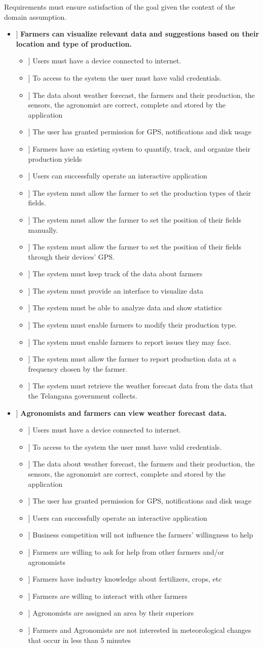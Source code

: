 \newcommand\goal[1]{\item[[ G#1]]}
\newcommand\dom[1]{\item[[ D#1]]}
\newcommand\req[1]{\item[[ R#1]]}

Requirements must ensure satisfaction of the goal given the context of the domain assumption.


\begin{itemize}
\goal{1} \textbf{Farmers can visualize relevant data and suggestions based on their location and type of production.}

\begin{itemize}
\dom{1}  Users must have a device connected to internet.
\dom{2} To access to the system the user must have valid credentials.
\dom{3} The data about weather forecast, the farmers and their production, the sensors, the agronomist are correct, complete and stored by the application
\dom{4} The user has granted permission for GPS, notifications and disk usage
\dom{5} Farmers have an existing system to quantify, track, and organize their production yields
\dom{6} Users can successfully operate an interactive application

\req{1} The system must allow the farmer to set the production types of their fields.
\req{2} The system must allow the farmer to set the position of their fields manually.
\req{3} The system must allow the farmer to set the position of their fields through their devices' GPS.
\req{4} The system must keep track of the data about farmers
\req{5} The system must provide an interface to visualize data
\req{6} The system must be able to analyze data and show statistics
\req{7} The system must enable farmers to modify their production type.
\req{8} The system must enable farmers to report issues they may face.
\req{9} The system must allow the farmer to report production data at a frequency chosen by the farmer.
\req{10} The system must retrieve the weather forecast data from the data that the Telangana government collects.
\end{itemize}

\goal{2}  \textbf{Agronomists and farmers can view weather forecast data.}

\begin{itemize}
\dom{1}  Users must have a device connected to internet.
\dom{2} To access to the system the user must have valid credentials.
\dom{3} The data about weather forecast, the farmers and their production, the sensors, the agronomist are correct, complete and stored by the application
\dom{4} The user has granted permission for GPS, notifications and disk usage
\dom{6} Users can successfully operate an interactive application
\dom{7} Business competition will not influence the farmers' willingness to help
\dom{8} Farmers are willing to ask for help from other farmers and/or agronomists
\dom{9} Farmers have industry knowledge about fertilizers, crops, etc 
\dom{10} Farmers are willing to interact with other farmers 
\dom{12} Agronomists are assigned an area by their superiors
\dom{16} Farmers and Agronomists are not interested in meteorological changes that occur in less than 5 minutes


\end{itemize}
\end{itemize}
